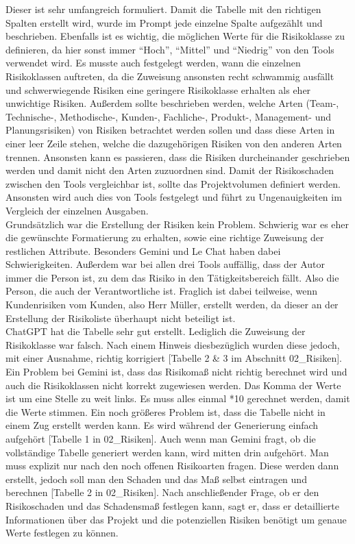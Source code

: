 Dieser ist sehr umfangreich formuliert. Damit die Tabelle mit den richtigen Spalten erstellt wird, wurde im Prompt jede
einzelne Spalte aufgezählt und beschrieben. Ebenfalls ist es wichtig, die möglichen Werte für die Risikoklasse zu 
definieren, da hier sonst immer ``Hoch'', ``Mittel'' und ``Niedrig'' von den Tools verwendet wird. Es musste auch 
festgelegt werden, wann die einzelnen Risikoklassen auftreten, da die Zuweisung ansonsten recht schwammig ausfällt und
schwerwiegende Risiken eine geringere Risikoklasse erhalten als eher unwichtige Risiken. Außerdem sollte beschrieben 
werden, welche Arten (Team-, Technische-, Methodische-, Kunden-, Fachliche-, Produkt-, Management- und Planungsrisiken) 
von Risiken betrachtet werden sollen und dass diese Arten in einer leer Zeile stehen, welche die dazugehörigen Risiken von 
den anderen Arten trennen. Ansonsten kann es passieren, dass die Risiken durcheinander geschrieben werden und damit nicht 
den Arten zuzuordnen sind. Damit der Risikoschaden zwischen den Tools vergleichbar ist, sollte das Projektvolumen definiert 
werden. Ansonsten wird auch dies von Tools festgelegt und führt zu Ungenauigkeiten im Vergleich der einzelnen Ausgaben.\\

Grundsätzlich war die Erstellung der Risiken kein Problem. Schwierig war es eher die gewünschte Formatierung zu erhalten, 
sowie eine richtige Zuweisung der restlichen Attribute. Besonders Gemini und Le Chat haben dabei Schwierigkeiten. 
Außerdem war bei allen drei Tools auffällig, dass der Autor immer die Person ist, zu dem das Risiko in den 
Tätigkeitsbereich fällt. Also die Person, die auch der Verantwortliche ist. Fraglich ist dabei teilweise, wenn 
Kundenrisiken vom Kunden, also Herr Müller, erstellt werden, da dieser an der Erstellung der Risikoliste überhaupt 
nicht beteiligt ist.\\

ChatGPT hat die Tabelle sehr gut erstellt. Lediglich die Zuweisung der Risikoklasse war falsch. Nach einem Hinweis 
diesbezüglich wurden diese jedoch, mit einer Ausnahme, richtig korrigiert [Tabelle 2 \& 3 im Abschnitt 02\_Risiken].\\

Ein Problem bei Gemini ist, dass das Risikomaß nicht richtig berechnet wird und auch die Risikoklassen nicht korrekt 
zugewiesen werden. Das Komma der Werte ist um eine Stelle zu weit links. Es muss alles einmal *10 gerechnet werden, damit die 
Werte stimmen. Ein noch größeres Problem ist, dass die Tabelle nicht in einem Zug erstellt werden kann. Es wird während der 
Generierung einfach aufgehört [Tabelle 1 in 02\_Risiken]. Auch wenn man Gemini fragt, ob die vollständige Tabelle generiert werden kann, wird mitten 
drin aufgehört. Man muss explizit nur nach den noch offenen Risikoarten fragen. Diese werden dann erstellt, jedoch soll man 
den Schaden und das Maß selbst eintragen und berechnen [Tabelle 2 in 02\_Risiken]. Nach anschließender Frage, ob er den Risikoschaden und das Schadensmaß 
festlegen kann, sagt er, dass er detaillierte Informationen über das Projekt und die potenziellen Risiken benötigt um genaue Werte 
festlegen zu können.\\

